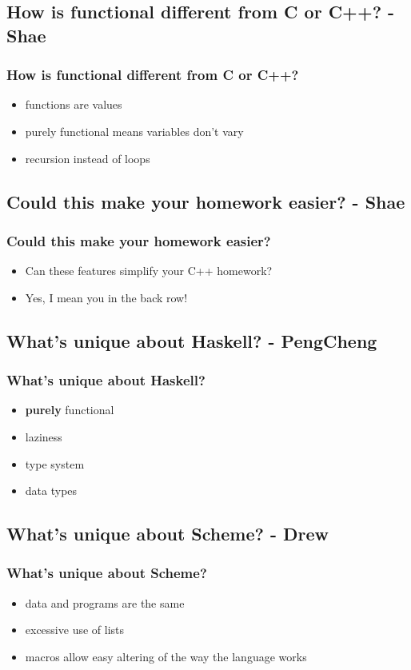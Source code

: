 \documentclass[xcolor=pdftex,dvipsnames,table]{beamer}
\begin{document}
\subsection{How is functional different from C or C++? - Shae}
\begin{frame}
  \frametitle{How is functional different from C or C++?}
  \begin{itemize}
  \item functions are values
  \item purely functional means variables don't vary
  \item recursion instead of loops
  \end{itemize}
\end{frame}

\subsection{Could this make your homework easier? - Shae}
\begin{frame}
  \frametitle{Could this make your homework easier?}
  \begin{itemize}
  \item Can these features simplify your C++ homework?
  \item Yes, I mean you in the back row!
  \end{itemize}
\end{frame}

\subsection{What's unique about Haskell? - PengCheng}
\begin{frame}
  \frametitle{What's unique about Haskell?}
  \begin{itemize}
  \item \textbf{purely} functional
  \item laziness
  \item type system
  \item data types
  \end{itemize}
\end{frame}

\subsection{What's unique about Scheme? - Drew}
\begin{frame}
  \frametitle{What's unique about Scheme?}
  \begin{itemize}
  \item data and programs are the same
  \item excessive use of lists
  \item macros allow easy altering of the way the language works
  \end{itemize}
\end{frame}
\end{document}

